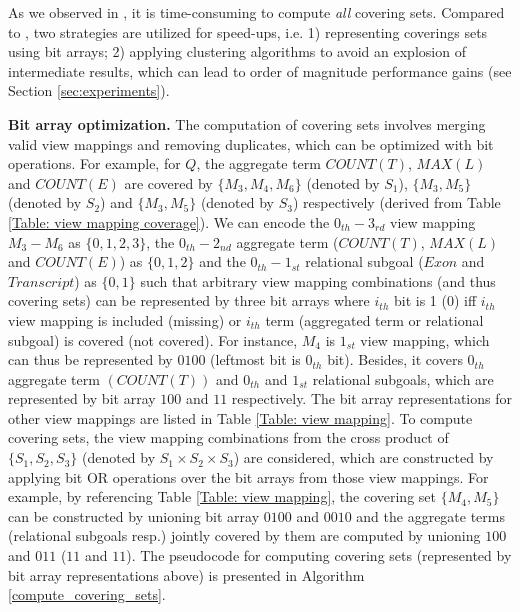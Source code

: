 \begin{example}
\end{example}

As we observed in \cite{wu2018data}, it is time-consuming to compute {\em all} covering sets. Compared to \cite{wu2018data}, two strategies are utilized for speed-ups, i.e. 1) representing coverings sets using bit arrays; 2) applying clustering algorithms to avoid an explosion of intermediate results, which can lead to order of magnitude performance gains (see Section \ref{sec:experiments}).

\textbf{Bit array optimization.} The computation of covering sets involves merging valid view mappings and removing duplicates, which can be optimized with bit operations. For example, for $Q$, the aggregate term $COUNT(T)$, $MAX(L)$ and $COUNT(E)$ are covered by $\{M_3, M_4, M_6\}$ (denoted by $S_1$), $\{M_3, M_5\}$ (denoted by $S_2$) and $\{M_3, M_5\}$ (denoted by $S_3$) respectively (derived from Table \ref{Table: view mapping coverage}). We can encode the $0_{th}-3_{rd}$ view mapping $M_3-M_6$ as $\{0,1,2,3\}$, the $0_{th}-2_{nd}$ aggregate term ($COUNT(T)$, $MAX(L)$ and $COUNT(E)$) as $\{0, 1, 2\}$ and the $0_{th}-1_{st}$ relational subgoal ($Exon$ and $Transcript$) as $\{0, 1\}$ such that arbitrary view mapping combinations (and thus covering sets) can be represented by three bit arrays where $i_{th}$ bit is 1 (0) iff $i_{th}$ view mapping is included (missing) or $i_{th}$ term (aggregated term or relational subgoal) is covered (not covered). For instance, $M_4$ is $1_{st}$ view mapping, which can thus be represented by $0100$ (leftmost bit is $0_{th}$ bit). Besides, it covers $0_{th}$ aggregate term $(COUNT(T))$ and $0_{th}$  and $1_{st}$ relational subgoals, which are represented by bit array $100$ and $11$ respectively. The bit array representations for other view mappings are listed in Table \ref{Table: view mapping}. To compute covering sets, the view mapping combinations from the cross product of $\{S_1, S_2, S_3\}$ (denoted by $S_1 \times S_2 \times S_3$) are considered, which are constructed by applying bit OR operations over the bit arrays from those view mappings. For example, by referencing Table \ref{Table: view mapping}, the covering set $\{M_4, M_5\}$ can be constructed by unioning bit array $0100$ and $0010$ and the aggregate terms (relational subgoals resp.) jointly covered by them are computed by unioning $100$ and $011$ ($11$ and $11$). The pseudocode for computing covering sets (represented by bit array representations above) is presented in Algorithm \ref{compute_covering_sets}.

